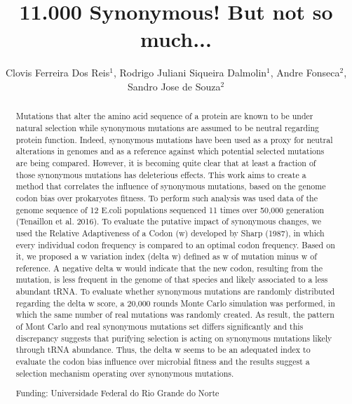 \documentclass[twoside]{article}
\title{\vspace{-15mm}\fontsize{24pt}{10pt}\selectfont\textbf{11.000 Synonymous! But not so much...}} %
\author{Clovis Ferreira Dos Reis$^1$, Rodrigo Juliani Siqueira Dalmolin$^1$, Andre Fonseca$^2$, Sandro Jose de Souza$^2$}
\affil{1 UFRN\\ }
\date{}
\begin{document}
\maketitle %

\thispagestyle{fancy} %


\begin{abstract}
Mutations that alter the amino acid sequence of a protein are known to be under natural selection while synonymous mutations are assumed to be neutral regarding protein function. Indeed, synonymous mutations have been used as a proxy for neutral alterations in genomes and as a reference against which potential selected mutations are being compared. However, it is becoming quite clear that at least a fraction of those synonymous mutations has deleterious effects. This work aims to create a method that correlates the influence of synonymous mutations, based on the genome codon bias over prokaryotes fitness. To perform such analysis was used data of the genome sequence of 12  E.coli populations sequenced 11 times over 50,000 generation (Tenaillon et al. 2016). To evaluate the putative impact of synonymous changes, we used the Relative Adaptiveness of a Codon (w) developed by Sharp (1987), in which every individual codon frequency is compared to an optimal codon frequency. Based on it, we proposed a w variation index (delta w)  defined as w of mutation minus w of reference. A negative delta w would indicate that the new codon, resulting from the mutation, is less frequent in the genome of that species and likely associated to a less abundant tRNA. To evaluate whether synonymous mutations are randomly distributed regarding the delta w score, a  20,000 rounds Monte Carlo simulation was performed, in which the same number of real mutations was randomly created.  As result, the pattern of Mont Carlo and real synonymous mutations set differs significantly and this discrepancy suggests that purifying selection is acting on synonymous mutations likely through tRNA abundance. Thus, the delta w seems to be an adequated index to evaluate the codon bias influence over microbial fitness and the results suggest a selection mechanism operating over synonymous mutations.

Funding: Universidade Federal do Rio Grande do Norte
\end{abstract}
\end{document}
